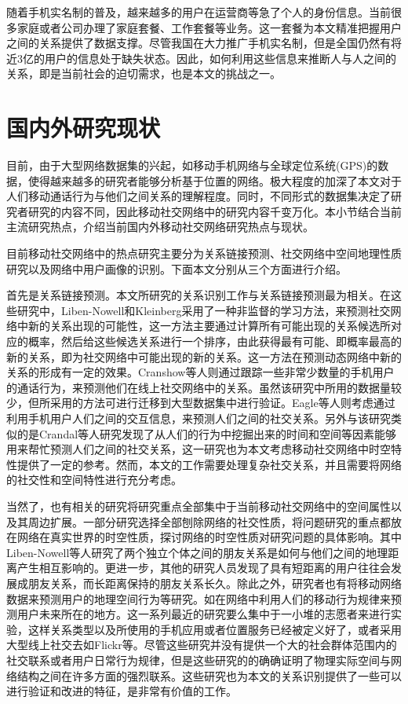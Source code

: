 随着手机实名制的普及，越来越多的用户在运营商等急了个人的身份信息。当前很多家庭或者公司办理了家庭套餐、工作套餐等业务。这一套餐为本文精准把握用户之间的关系提供了数据支撑。尽管我国在大力推广手机实名制，但是全国仍然有将近3亿的用户的信息处于缺失状态。因此，如何利用这些信息来推断人与人之间的关系，即是当前社会的迫切需求，也是本文的挑战之一。


\section{国内外研究现状}

目前，由于大型网络数据集的兴起，如移动手机网络与全球定位系统(GPS)的数据，使得越来越多的研究者能够分析基于位置的网络。极大程度的加深了本文对于人们移动通话行为与他们之间关系的理解程度。同时，不同形式的数据集决定了研究者研究的内容不同，因此移动社交网络中的研究内容千变万化。本小节结合当前主流研究热点，介绍当前国内外移动社交网络研究热点与现状。

目前移动社交网络中的热点研究主要分为关系链接预测、社交网络中空间地理性质研究以及网络中用户画像的识别。下面本文分别从三个方面进行介绍。

首先是关系链接预测。本文所研究的关系识别工作与关系链接预测最为相关。在这些研究中，Liben-Nowell和Kleinberg采用了一种非监督的学习方法，来预测社交网络中新的关系出现的可能性，这一方法主要通过计算所有可能出现的关系候选所对应的概率，然后给这些候选关系进行一个排序，由此获得最有可能、即概率最高的新的关系，即为社交网络中可能出现的新的关系。这一方法在预测动态网络中新的关系的形成有一定的效果。Cranshow等人则通过跟踪一些非常少数量的手机用户的通话行为，来预测他们在线上社交网络中的关系。虽然该研究中所用的数据量较少，但所采用的方法可进行迁移到大型数据集中进行验证。Eagle等人则考虑通过利用手机用户人们之间的交互信息，来预测人们之间的社交关系。另外与该研究类似的是Crandal等人研究发现了从人们的行为中挖掘出来的时间和空间等因素能够用来帮忙预测人们之间的社交关系，这一研究也为本文考虑移动社交网络中时空特性提供了一定的参考。然而，本文的工作需要处理复杂社交关系，并且需要将网络的社交性和空间特性进行充分考虑。


当然了，也有相关的研究将研究重点全部集中于当前移动社交网络中的空间属性以及其周边扩展。一部分研究选择全部刨除网络的社交性质，将问题研究的重点都放在网络在真实世界的时空性质，探讨网络的时空性质对研究问题的具体影响。其中Liben-Nowell等人研究了两个独立个体之间的朋友关系是如何与他们之间的地理距离产生相互影响的。更进一步，其他的研究人员发现了具有短距离的用户往往会发展成朋友关系，而长距离保持的朋友关系长久。除此之外，研究者也有将移动网络数据来预测用户的地理空间行为等研究。如在网络中利用人们的移动行为规律来预测用户未来所在的地方。这一系列最近的研究要么集中于一小堆的志愿者来进行实验，这样关系类型以及所使用的手机应用或者位置服务已经被定义好了，或者采用大型线上社交去如Flickr等。尽管这些研究并没有提供一个大的社会群体范围内的社交联系或者用户日常行为规律，但是这些研究的的确确证明了物理实际空间与网络结构之间在许多方面的强烈联系。这些研究也为本文的关系识别提供了一些可以进行验证和改进的特征，是非常有价值的工作。


